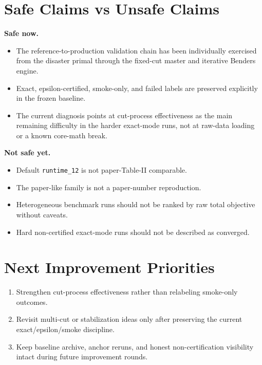 \documentclass[11pt]{article}
\begin{document}
\section{Safe Claims vs Unsafe Claims}
\textbf{Safe now.}
\begin{itemize}
\item The reference-to-production validation chain has been individually exercised from the disaster primal through the fixed-cut master and iterative Benders engine.
\item Exact, epsilon-certified, smoke-only, and failed labels are preserved explicitly in the frozen baseline.
\item The current diagnosis points at cut-process effectiveness as the main remaining difficulty in the harder exact-mode runs, not at raw-data loading or a known core-math break.
\end{itemize}

\textbf{Not safe yet.}
\begin{itemize}
\item Default \texttt{runtime\_12} is not paper-Table-II comparable.
\item The paper-like family is not a paper-number reproduction.
\item Heterogeneous benchmark runs should not be ranked by raw total objective without caveats.
\item Hard non-certified exact-mode runs should not be described as converged.
\end{itemize}

\section{Next Improvement Priorities}
\begin{enumerate}
\item Strengthen cut-process effectiveness rather than relabeling smoke-only outcomes.
\item Revisit multi-cut or stabilization ideas only after preserving the current exact/epsilon/smoke discipline.
\item Keep baseline archive, anchor reruns, and honest non-certification visibility intact during future improvement rounds.
\end{enumerate}
\end{document}
